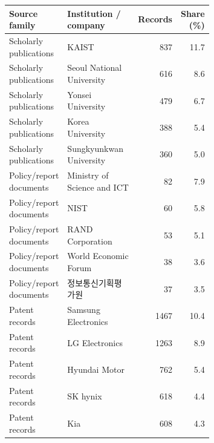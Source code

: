 \begin{tabular}{p{0.24\linewidth}p{0.43\linewidth}rr}
\toprule
Source family & Institution / company & Records & Share (\%) \\
\midrule
Scholarly publications & KAIST & 837 & 11.7 \\
Scholarly publications & Seoul National University & 616 & 8.6 \\
Scholarly publications & Yonsei University & 479 & 6.7 \\
Scholarly publications & Korea University & 388 & 5.4 \\
Scholarly publications & Sungkyunkwan University & 360 & 5.0 \\
Policy/report documents & Ministry of Science and ICT & 82 & 7.9 \\
Policy/report documents & NIST & 60 & 5.8 \\
Policy/report documents & RAND Corporation & 53 & 5.1 \\
Policy/report documents & World Economic Forum & 38 & 3.6 \\
Policy/report documents & 정보통신기획평가원 & 37 & 3.5 \\
Patent records & Samsung Electronics & 1467 & 10.4 \\
Patent records & LG Electronics & 1263 & 8.9 \\
Patent records & Hyundai Motor & 762 & 5.4 \\
Patent records & SK hynix & 618 & 4.4 \\
Patent records & Kia & 608 & 4.3 \\
\bottomrule
\end{tabular}
